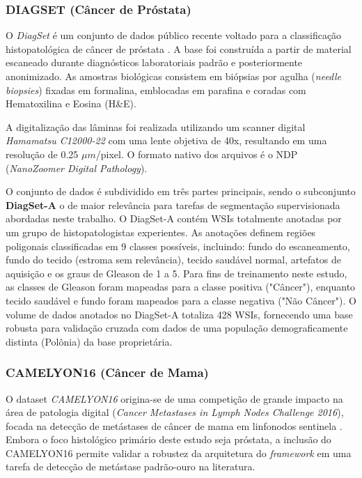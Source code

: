 \subsubsection{DIAGSET (Câncer de Próstata)}\label{subsubsec:dataset_diagset}

O \textit{DiagSet} é um conjunto de dados público recente voltado para a classificação histopatológica de câncer de próstata \cite{Koziarski2024DiagSet}. A base foi construída a partir de material escaneado durante diagnósticos laboratoriais padrão e posteriormente anonimizado. As amostras biológicas consistem em biópsias por agulha (\textit{needle biopsies}) fixadas em formalina, emblocadas em parafina e coradas com Hematoxilina e Eosina (H\&E).

A digitalização das lâminas foi realizada utilizando um scanner digital \textit{Hamamatsu C12000-22} com uma lente objetiva de 40x, resultando em uma resolução de 0.25 $\mu m$/pixel. O formato nativo dos arquivos é o NDP (\textit{NanoZoomer Digital Pathology}).

O conjunto de dados é subdividido em três partes principais, sendo o subconjunto \textbf{DiagSet-A} o de maior relevância para tarefas de segmentação supervisionada abordadas neste trabalho. O DiagSet-A contém WSIs totalmente anotadas por um grupo de histopatologistas experientes. As anotações definem regiões poligonais classificadas em 9 classes possíveis, incluindo: fundo do escaneamento, fundo do tecido (estroma sem relevância), tecido saudável normal, artefatos de aquisição e os graus de Gleason de 1 a 5. Para fins de treinamento neste estudo, as classes de Gleason foram mapeadas para a classe positiva ("Câncer"), enquanto tecido saudável e fundo foram mapeados para a classe negativa ("Não Câncer"). O volume de dados anotados no DiagSet-A totaliza 428 WSIs, fornecendo uma base robusta para validação cruzada com dados de uma população demograficamente distinta (Polônia) da base proprietária.

\subsubsection{CAMELYON16 (Câncer de Mama)}\label{subsubsec:dataset_camelyon}

O dataset \textit{CAMELYON16} origina-se de uma competição de grande impacto na área de patologia digital (\textit{Cancer Metastases in Lymph Nodes Challenge 2016}), focada na detecção de metástases de câncer de mama em linfonodos sentinela \cite{bandi2019detection}. Embora o foco histológico primário deste estudo seja próstata, a inclusão do CAMELYON16 permite validar a robustez da arquitetura do \textit{framework} em uma tarefa de detecção de metástase padrão-ouro na literatura.

